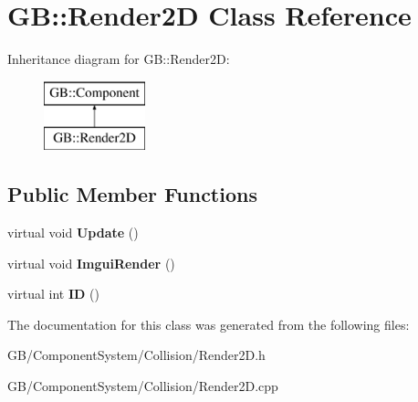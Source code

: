 \hypertarget{class_g_b_1_1_render2_d}{}\section{GB\+::Render2D Class Reference}
\label{class_g_b_1_1_render2_d}
Inheritance diagram for GB\+::Render2D\+:\begin{figure}[H]
\begin{center}
\leavevmode
\includegraphics[height=2.000000cm]{class_g_b_1_1_render2_d}
\end{center}
\end{figure}
\subsection*{Public Member Functions}
\begin{DoxyCompactItemize}
\item 
\mbox{\label{class_g_b_1_1_render2_d_a98472e8c1f48a36fbdfab5b9e8c7fbc4}} 
virtual void {\bfseries Update} ()
\item 
\mbox{\label{class_g_b_1_1_render2_d_ac63f2c547d16fe5f61d66c0a92ac3146}} 
virtual void {\bfseries Imgui\+Render} ()
\item 
\mbox{\label{class_g_b_1_1_render2_d_ab29ebb9f49dd43788a51e1a91a16f91a}} 
virtual int {\bfseries ID} ()
\end{DoxyCompactItemize}


The documentation for this class was generated from the following files\+:\begin{DoxyCompactItemize}
\item 
G\+B/\+Component\+System/\+Collision/Render2\+D.\+h\item 
G\+B/\+Component\+System/\+Collision/Render2\+D.\+cpp\end{DoxyCompactItemize}
